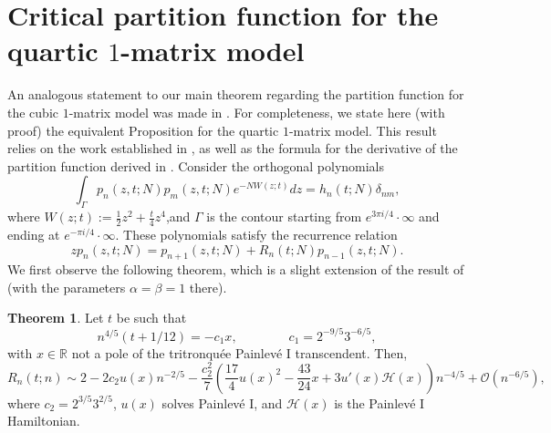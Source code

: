 \documentclass[usenames,dvipsnames]{article}
\theoremstyle{definition}
\newtheorem{theorem}{Theorem}[section]
\numberwithin{equation}{section}
\numberwithin{figure}{section}
\begin{document}
\section{Critical partition function for the quartic $1$-matrix model}

    An analogous statement to our main theorem regarding the partition function for the cubic $1$-matrix model was made in \cite{BleherDeano}. For completeness, we state here (with proof) the equivalent Proposition for the quartic $1$-matrix model. This result relies on the work established in \cite{DK0}, as well as the formula for the derivative of the partition function derived in \cite{BGM}. Consider the orthogonal polynomials
        \begin{equation}
            \int_{\Gamma} p_n(z,t;N)p_m(z,t;N)e^{-NW(z;t)}dz = h_n(t;N)\delta_{nm},
        \end{equation}
    where $W(z;t):=\frac{1}{2}z^2 + \frac{t}{4}z^4$,and $\Gamma$ is the contour starting from $e^{3\pi i/4}\cdot\infty$ and ending at $e^{-\pi i/4}\cdot \infty$. These polynomials satisfy the recurrence relation
        \begin{equation}
            zp_n(z,t;N)=p_{n+1}(z,t;N) + R_n(t;N)p_{n-1}(z,t;N).
        \end{equation}
    We first observe the following theorem, which is a slight extension of the result of \cite{DK0} (with the parameters $\alpha = \beta = 1$ there).
    \begin{theorem}
        Let $t$ be such that
        \begin{equation}
            n^{4/5}(t+1/12) = -c_1x,\qquad\qquad c_1 = 2^{-9/5}3^{-6/5},
        \end{equation}
        with $x\in \mathbb{R}$ not a pole of the tritronqu\'{e}e Painlev\'{e} I transcendent. Then,
        \begin{equation}
            R_n(t;n)\sim 2 - 2c_2 u(x)n^{-2/5}-\frac{c_2^2}{7}\left(\frac{17}{4}u(x)^2-\frac{43}{24}x+3u'(x)\mathcal{H}(x)\right)n^{-4/5} + \mathcal{O}(n^{-6/5}),
        \end{equation}
        where $c_2=2^{3/5}3^{2/5}$, $u(x)$ solves Painlev\'{e} I, and $\mathcal{H}(x)$ is the Painlev\'{e} I Hamiltonian.
    \end{theorem}
    
\end{document}
